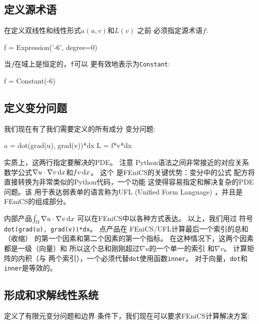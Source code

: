 
\subsection{定义源术语}

在定义双线性和线性形式$a(u,v)$和$L(v)$ 之前
必须指定源术语$f$:

\begin{python}
f = Expression('-6', degree=0)
\end{python}
当$f$在域上是恒定的，\texttt{f}可以
更有效地表示为\texttt{Constant}:

\begin{python}
f = Constant(-6)
\end{python}

\subsection{定义变分问题}

我们现在有了我们需要定义的所有成分
变分问题:

\begin{python}
a = dot(grad(u), grad(v))*dx
L = f*v*dx
\end{python}
实质上，这两行指定要解决的PDE。 注意
Python语法之间非常接近的对应关系
数学公式$\nabla u\cdot\nabla v \dx$和$fv \dx$。 这个
是FEniCS的关键优势：变分中的公式
配方将直接转换为非常类似的Python代码，一个功能
这使得容易指定和解决复杂的PDE问题。该
用于表达弱表单的语言称为UFL (Unified Form Language)\cite{UFL_2014,FEniCS}
，并且是FEniCS的组成部分。

\begin{notice}[表达内在产品]
内部产品$\int_{\Omega} \nabla u \cdot \nabla v \dx$
可以在FEniCS中以各种方式表达。 以上，我们用过
符号\texttt{dot(grad(u), grad(v))*dx}。 点产品在
FEniCS/UFL计算最后一个索引的总和（收缩）
的第一个因素和第二个因素的第一个指标。
在这种情况下，这两个因素都是一级（向量）和
所以这个总和刚刚超过$\nabla u$的一个单一的索引
和$\nabla v$。 计算矩阵的内积（与
两个索引），一个必须代替\texttt{dot}使用函数\texttt{inner}。
对于向量，\texttt{dot}和\texttt{inner}是等效的。
\end{notice}

\subsection{形成和求解线性系统}

定义了有限元变分问题和边界
条件下，我们现在可以要求FEniCS计算解决方案:

